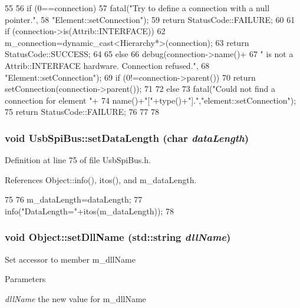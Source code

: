 \begin{DoxyCode}
55                                                       {
56   if (0==connection){
57     fatal("Try to define a connection with a null pointer.",
58         "Element::setConnection");
59     return StatusCode::FAILURE;
60   }
61   if (connection->is(Attrib::INTERFACE)){
62     m_connection=dynamic_cast<Hierarchy*>(connection);
63     return StatusCode::SUCCESS;
64   }
65   else {
66     debug(connection->name()+
67         " is not a Attrib::INTERFACE hardware. Connection refused.",
68         "Element::setConnection");
69     if (0!=connection->parent()){
70       return setConnection(connection->parent());
71     }
72     else{
73       fatal("Could not find a connection for element "+
74           name()+"["+type()+"].","element::setConnection");
75       return StatusCode::FAILURE;
76     }
77   }
78 }
\end{DoxyCode}
\hypertarget{classUsbSpiBus_abb9644f0110078dc08c84c907d11272e}{
\subsubsection[{setDataLength}]{\setlength{\rightskip}{0pt plus 5cm}void UsbSpiBus::setDataLength (char {\em dataLength})}}
\label{classUsbSpiBus_abb9644f0110078dc08c84c907d11272e}


Definition at line 75 of file UsbSpiBus.h.

References Object::info(), itos(), and m\_\-dataLength.


\begin{DoxyCode}
75                                      {
76       m_dataLength=dataLength;
77       info("DataLength="+itos(m_dataLength));
78   }
\end{DoxyCode}
\hypertarget{classObject_a870c5af919958c2136623b2d7816d123}{
\subsubsection[{setDllName}]{\setlength{\rightskip}{0pt plus 5cm}void Object::setDllName (std::string {\em dllName})}}
\label{classObject_a870c5af919958c2136623b2d7816d123}
Set accessor to member m\_\-dllName 
\begin{DoxyParams}{Parameters}
\item[{\em dllName}]the new value for m\_\-dllName \end{DoxyParams}


